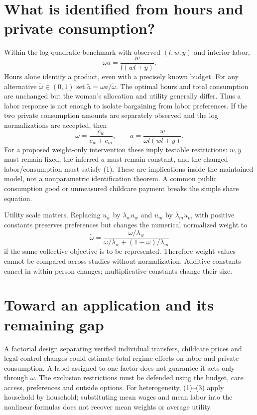 \documentclass[11pt]{article}
\theoremstyle{definition}
\begin{document}
\section*{What is identified from hours and private consumption?}
Within the log-quadratic benchmark with observed $(l,w,y)$ and interior labor,
\[
 \omega a=\frac{w}{l(wl+y)}.                              \tag{2}
\]
Hours alone identify a product, even with a precisely known budget. For any
alternative $\widetilde\omega\in(0,1)$ set
$\widetilde a=\omega a/\widetilde\omega$. The optimal hours and total
consumption are unchanged but the woman's allocation and utility generally
differ. Thus a labor response is not enough to isolate bargaining from labor
preferences.
If the two private consumption amounts are separately observed and the log
normalizations are accepted, then
\[
 \omega=\frac{c_w}{c_w+c_m},\qquad
 a=\frac{w}{\omega l(wl+y)}.                             \tag{3}
\]
For a proposed weight-only intervention these imply testable restrictions:
$w,y$ must remain fixed, the inferred $a$ must remain constant, and the changed
labor/consumption must satisfy (1). These are implications inside the maintained
model, not a nonparametric identification theorem. A common public consumption
good or unmeasured childcare payment breaks the simple share equation.

Utility scale matters. Replacing $u_w$ by $\lambda_wu_w$ and $u_m$ by
$\lambda_mu_m$ with positive constants preserves preferences but changes the
numerical normalized weight to
\[
 \widetilde\omega=
 \frac{\omega/\lambda_w}{\omega/\lambda_w+(1-\omega)/\lambda_m}
\]
if the same collective objective is to be represented. Therefore weight values
cannot be compared across studies without normalization. Additive constants
cancel in within-person changes; multiplicative constants change their size.

\section*{Toward an application and its remaining gap}
A factorial design separating verified individual transfers, childcare prices
and legal-control changes could estimate total regime effects on labor and
private consumption. A label assigned to one factor does not guarantee it acts
only through $\omega$. The exclusion restrictions must be defended using the
budget, care access, preferences and outside options. For heterogeneity, (1)--(3)
apply household by household; substituting mean wages and mean labor into the
nonlinear formulas does not recover mean weights or average utility.
\end{document}
